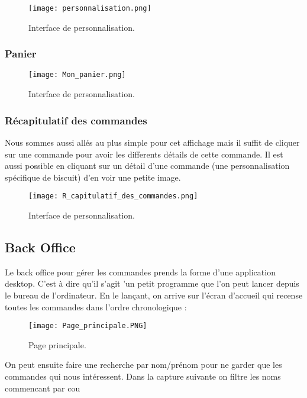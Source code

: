 \documentclass[a4paper]{article}
\begin{document}
\begin{figure}[H]
\centering
\texttt{[image: personnalisation.png]}
\caption{\label{fig:tp1-exo1}Interface de personnalisation.}
\end{figure}


\subsubsection{Panier}

\begin{figure}[H]
\centering
\texttt{[image: Mon\_panier.png]}
\caption{\label{fig:tp1-exo1}Interface de personnalisation.}
\end{figure}

\subsubsection{Récapitulatif des commandes}

Nous sommes aussi allés au plus simple pour cet affichage mais il suffit de cliquer sur une commande pour avoir les differents détails de cette commande. Il est aussi possible en cliquant sur un détail d'une commande (une personnalisation spécifique de biscuit) d'en voir une petite image.

\begin{figure}[H]
\centering
\texttt{[image: R\_capitulatif\_des\_commandes.png]}
\caption{\label{fig:tp1-exo1}Interface de personnalisation.}
\end{figure}

\subsection{Back Office}

Le back office pour gérer les commandes prends la forme d'une application desktop. C'est à dire qu'il s'agit 'un petit programme que l'on peut lancer depuis le bureau de l'ordinateur.
En le lançant, on arrive sur l'écran d'accueil qui recense toutes les commandes dans l'ordre chronologique :


\begin{figure}[H]
\centering
\texttt{[image: Page\_principale.PNG]}
\caption{\label{fig:tp1-exo1}Page principale.}
\end{figure}

On peut ensuite faire une recherche par nom/prénom pour ne garder que les commandes qui nous intéressent. Dans la capture suivante on filtre les noms commencant par cou
\end{document}
